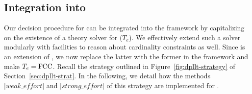 \documentclass{svjour3}                     %
\begin{document}
\begin{comment}
\subsection{Integration into \dpllts} 
\label{sec:fcc-dpllts}

We now describe how the decision procedure for \fcc can be integrated into the \dpllts framework,
where $T_i$ is \fcc.
While updating the current state $\state{M,F,C}$,
we assume a standard algorithm for computing a congruence closure for $M$ and 
for reporting conflicts when none exists.

In addition to determining $M$ is unsatisfiable due to congruence, 
the decision procedure reports ``unsatisfiable" in one of two ways,
each of which corresponds to a legal application of \conflict{i}.
First, 
when $M$ contains conflicting cardinality literals for some sort $S$,
we may apply \conflict{i} with $\Cc := ( \neg \card[S,k] \vee \card[S,j] )$ for $j > k$.
Second, 
when $M$ contains $\card[S,k]$ and entails that there are more than $k$ equivalence classes of sort $S$,
we may apply \conflict{i} with $\Cc := ( \compl{l_1} \vee \ldots \vee \compl{l_n} \vee \neg \card[S,k] )$, 
where $l_1, \ldots, l_n$ is a set of equalities and disequalities from $M$ that entail that some terms $t_1, \ldots, t_n$ are distinct in all models of $M$.
In either case, the negated conjunction of the literals from the conflict imply a contradiction.

To model the splitting as performed by the decision procedure, 
when $M$ contains $\card[S,k]$ and more than $k$ equivalence classes currently exist,
we may apply the rule \learn{i} to add $( s \teq t \vee s \tneq t )$ to our set of clauses $F$ 
for two terms $s, t$ residing in two different equivalence classes where $M \not\models s \tneq t$.
Since the algorithm for constructing a congruence closure does not introduce new terms beyond those in $F_0$, 
we are ensured that $s$ and $t$ are terms that exist in our original set of clauses $F_0$.
\end{comment}

\subsection{Integration into \dpllts}
\label{sec:fcc-dpllts-opt}

Our decision procedure for \fcc can be integrated into the \dpllts framework
by capitalizing on the existence of a theory solver for \euf ($T_e$).
We effectively extend such a solver modularly with facilities to reason 
about cardinality constraints as well.
Since \fcc is an extension of \euf, we now replace the latter with the former
in the framework and make $T_e = \mathrm{FCC}$.
Recall the strategy outlined in Figure~\ref{fig:dpllt-strategy} of Section~\ref{sec:dpllt-strat}.
In the following, we detail how
the methods $|weak\_effort|$ and $|strong\_effort|$ of this strategy are implemented for \fcc.
\end{document}
